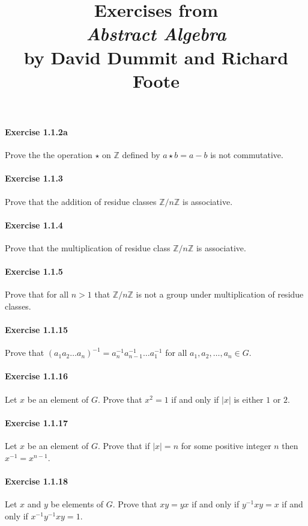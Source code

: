 \documentclass{article}
\title{\textbf{
Exercises from \\
\textit{Abstract Algebra} \\
by David Dummit and Richard Foote
}}
\date{}
\begin{document}
\maketitle

\paragraph{Exercise 1.1.2a} Prove the the operation $\star$ on $\mathbb{Z}$ defined by $a\star b=a-b$ is not commutative.

\paragraph{Exercise 1.1.3} Prove that the addition of residue classes $\mathbb{Z}/n\mathbb{Z}$ is associative.

\paragraph{Exercise 1.1.4} Prove that the multiplication of residue class $\mathbb{Z}/n\mathbb{Z}$ is associative.

\paragraph{Exercise 1.1.5} Prove that for all $n>1$ that $\mathbb{Z}/n\mathbb{Z}$ is not a group under multiplication of residue classes.

\paragraph{Exercise 1.1.15} Prove that $(a_1a_2\dots a_n)^{-1} = a_n^{-1}a_{n-1}^{-1}\dots a_1^{-1}$ for all $a_1, a_2, \dots, a_n\in G$.

\paragraph{Exercise 1.1.16} Let $x$ be an element of $G$. Prove that $x^2=1$ if and only if $|x|$ is either $1$ or $2$.

\paragraph{Exercise 1.1.17} Let $x$ be an element of $G$. Prove that if $|x|=n$ for some positive integer $n$ then $x^{-1}=x^{n-1}$.

\paragraph{Exercise 1.1.18} Let $x$ and $y$ be elements of $G$. Prove that $xy=yx$ if and only if $y^{-1}xy=x$ if and only if $x^{-1}y^{-1}xy=1$.
\end{document}
